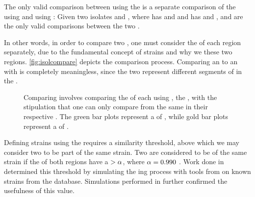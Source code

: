 \begin{principle}\label{principle:comparing-isolates}
The only valid comparison between \isols{} using the \pearson{} \pcfunclabel{} is a separate comparison of the \Ssixt{} \pyros{} using \pcfunclabel{} and \Sfive{} \pyros{} using \pcfunclabel{}:
Given two isolates \isola{} and \isolb{}, where 
\isola{} has \pyros{} \isolasixt{} and \isolafive{}
and
\isolb{} has \pyros{} \isolbsixt{} and \isolbfive{},
\pcisolsixt{}
and
\pcisolfive{}
are the only valid comparisons between the two \isols{}.
\end{principle}
\index{\pearson{}}
\index{\pcfunclabel{}}

\noindent 
In other words, in order to compare two \isols{}, one must consider the \pyros{} of each \itsshort{} region separately, due to the fundamental concept of strains and why we \pyro{} these two regions.
\autoref{fig:isolcompare} depicts the comparison process.
Comparing an \Ssixt{} \pyro{} to an \Sfive{} \pyro{} with \pcfunclabel{} is completely meaningless, since the two \pyros{} represent different segments of \dna{} in the \ecoli{}.

\begin{figure}
    \centering
    
    
    
    \caption{Comparing \isols{} involves comparing the \pyros{} of each \isol{} using \pcfunclabel{}, the \pearson{}, with the stipulation that one can only compare \pyros{} from the same \itsshort{} in their respective \isol{}. The green bar plots represent a \pyro{} of \Ssixt{}, while gold bar plots represent a \pyro{} of \Sfive{}.}
    \label{fig:isolcompare}
\end{figure}

Defining strains using the \pearson{} requires a similarity threshold, above which we may consider two \isols{} to be part of the same strain.
Two \isols{} are considered to be of the same strain if the \pyros{} of both regions have a $  > \alpha{}$, where $\alpha{} = 0.990$ \cite{Shealy:SeniorProject, Black2014121}.
\index{\a{}}
Work done in \cite{Shealy:SeniorProject} determined this \a{} threshold by simulating the \pyro{}ing process with tools from \cite{montana2013algorithms} on known \ecoli{} strains from the \ncbilong{} database.
Simulations performed in \cite{DBLP:conf/bibm/BrandtMSBGK12} further confirmed the usefulness of this \a{} value.


